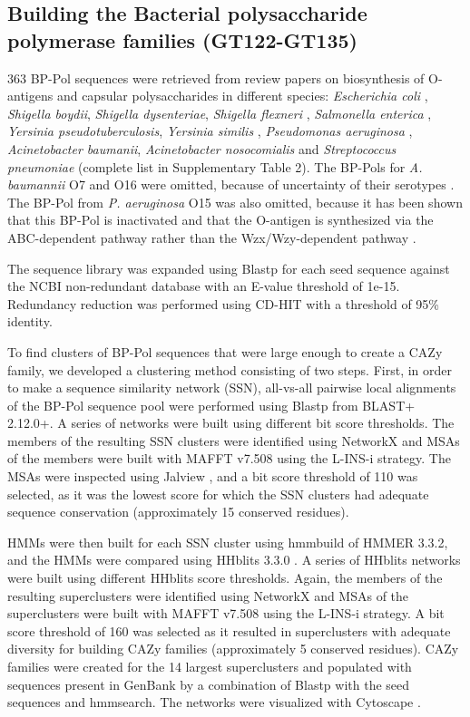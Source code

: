 \documentclass{article}
\begin{document}
\subsection{Building the Bacterial polysaccharide polymerase families (GT122-GT135)}
363 BP-Pol sequences were retrieved from review papers on biosynthesis of O-antigens and capsular polysaccharides in different species: \textit{Escherichia coli} \cite{iguchi_complete_2015}, \textit{Shigella boydii}, \textit{Shigella dysenteriae}, \textit{Shigella flexneri} \cite{liu_structure_2008}, \textit{Salmonella enterica} \cite{liu_structural_2014}, \textit{Yersinia pseudotuberculosis}, \textit{Yersinia similis} \cite{kenyon_genetics_2017}, \textit{Pseudomonas aeruginosa} \cite{islam_synthesis_2014}, \textit{Acinetobacter baumanii}, \textit{Acinetobacter nosocomialis} \cite{hu_diversity_2013} and
\textit{Streptococcus pneumoniae} \cite{bentley_genetic_2006} (complete list in Supplementary Table 2). The BP-Pols for \textit{A. baumannii} O7 and O16 were omitted, because of uncertainty of their serotypes \cite{hu_diversity_2013}. The BP-Pol from \textit{P. aeruginosa} O15 was also omitted, because it has been shown that this BP-Pol is inactivated and that the O-antigen is synthesized via the ABC-dependent pathway rather than the Wzx/Wzy-dependent pathway \cite{huszczynski_identification_2020}.

The sequence library was expanded using Blastp for each seed sequence against the NCBI non-redundant database with an E-value threshold of 1e-15. Redundancy reduction was performed using CD-HIT with a threshold of 95\% identity.

To find clusters of BP-Pol sequences that were large enough to create a CAZy family, we developed a clustering method consisting of two steps. First, in order to make a sequence similarity network (SSN), all-vs-all pairwise local alignments of the BP-Pol sequence pool were performed using Blastp from BLAST+ 2.12.0+. A series of networks were built using different bit score thresholds. The members of the resulting SSN clusters were identified using NetworkX \cite{hagberg_exploring_2008} and MSAs of the members were built with MAFFT v7.508 using the L-INS-i strategy. The MSAs were inspected using Jalview \cite{waterhouse_jalview_2009}, and a bit score threshold of 110 was selected, as it was the lowest score for which the SSN clusters had adequate sequence conservation (approximately 15 conserved residues).

HMMs were then built for each SSN cluster using hmmbuild of HMMER 3.3.2, and the HMMs were compared using HHblits 3.3.0 \cite{steinegger_hh-suite3_2019}. A series of HHblits networks were built using different HHblits score thresholds. Again, the members of the resulting superclusters were identified using NetworkX and MSAs of the superclusters were built with MAFFT v7.508 using the L-INS-i strategy. A bit score threshold of 160 was selected as it resulted in superclusters with adequate diversity for building CAZy families (approximately 5 conserved residues). CAZy families were created for the 14 largest superclusters and populated with sequences present in GenBank by a combination of Blastp with the seed sequences and hmmsearch. The networks were visualized with Cytoscape \cite{shannon_cytoscape_2003}. 
\end{document}
